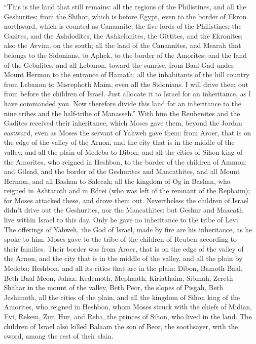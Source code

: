  ``This is the land that still remains: all the regions of
the Philistines, and all the Geshurites;  from the Shihor,
which is before Egypt, even to the border of Ekron northward, which is
counted as Canaanite; the five lords of the Philistines; the Gazites,
and the Ashdodites, the Ashkelonites, the Gittites, and the Ekronites;
also the Avvim,  on the south; all the land of the
Canaanites, and Mearah that belongs to the Sidonians, to Aphek, to the
border of the Amorites;  and the land of the Gebalites, and
all Lebanon, toward the sunrise, from Baal Gad under Mount Hermon to the
entrance of Hamath;  all the inhabitants of the hill country
from Lebanon to Misrephoth Maim, even all the Sidonians. I will drive
them out from before the children of Israel. Just allocate it to Israel
for an inheritance, as I have commanded you.  Now therefore
divide this land for an inheritance to the nine tribes and the
half-tribe of Manasseh.''  With him the Reubenites and the
Gadites received their inheritance, which Moses gave them, beyond the
Jordan eastward, even as Moses the servant of Yahweh gave them:
 from Aroer, that is on the edge of the valley of the Arnon,
and the city that is in the middle of the valley, and all the plain of
Medeba to Dibon;  and all the cities of Sihon king of the
Amorites, who reigned in Heshbon, to the border of the children of
Ammon;  and Gilead, and the border of the Geshurites and
Maacathites, and all Mount Hermon, and all Bashan to Salecah;
 all the kingdom of Og in Bashan, who reigned in Ashtaroth
and in Edrei (who was left of the remnant of the Rephaim); for Moses
attacked these, and drove them out.  Nevertheless the
children of Israel didn't drive out the Geshurites, nor the Maacathites:
but Geshur and Maacath live within Israel to this day. 
Only he gave no inheritance to the tribe of Levi. The offerings of
Yahweh, the God of Israel, made by fire are his inheritance, as he spoke
to him.  Moses gave to the tribe of the children of Reuben
according to their families.  Their border was from Aroer,
that is on the edge of the valley of the Arnon, and the city that is in
the middle of the valley, and all the plain by Medeba; 
Heshbon, and all its cities that are in the plain; Dibon, Bamoth Baal,
Beth Baal Meon,  Jahaz, Kedemoth, Mephaath, 
Kiriathaim, Sibmah, Zereth Shahar in the mount of the valley,
 Beth Peor, the slopes of Pisgah, Beth Jeshimoth,
 all the cities of the plain, and all the kingdom of Sihon
king of the Amorites, who reigned in Heshbon, whom Moses struck with the
chiefs of Midian, Evi, Rekem, Zur, Hur, and Reba, the princes of Sihon,
who lived in the land.  The children of Israel also killed
Balaam the son of Beor, the soothsayer, with the sword, among the rest
of their slain.

